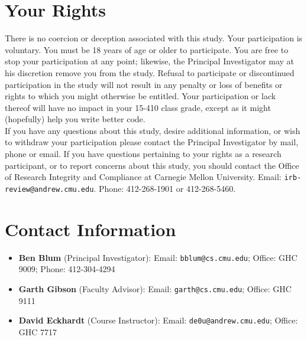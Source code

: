 \documentclass{article}
\begin{document}
\section{Your Rights}
There is no coercion or deception associated with this study.
Your participation is voluntary.
You must be 18 years of age or older to participate.
You are free to stop your participation at any point; likewise, the Principal Investigator may at his discretion remove you from the study.
Refusal to participate or discontinued participation in the study will not result in any penalty or loss of benefits or rights to which you might otherwise be entitled.
Your participation or lack thereof will have no impact in your 15-410 class grade, except as it might (hopefully) help you write better code.
\\

\noindent If you have any questions about this study, desire additional information, or wish to withdraw
your participation please contact the Principal Investigator by mail, phone or email.
If you have questions pertaining to your rights as a research participant,
or to report concerns about this study, you should contact the
Office of Research Integrity and Compliance at Carnegie Mellon University.
Email: {\tt irb-review@andrew.cmu.edu}. Phone: 412-268-1901 or 412-268-5460.

\section{Contact Information}

\begin{itemize}
	\item {\bf Ben Blum} (Principal Investigator): Email: {\tt bblum@cs.cmu.edu}; Office: GHC 9009; Phone: 412-304-4294
	\item {\bf Garth Gibson} (Faculty Advisor): Email: {\tt garth@cs.cmu.edu}; Office: GHC 9111
	\item {\bf David Eckhardt} (Course Instructor): Email: {\tt de0u@andrew.cmu.edu}; Office: GHC 7717
\end{itemize}
\end{document}
